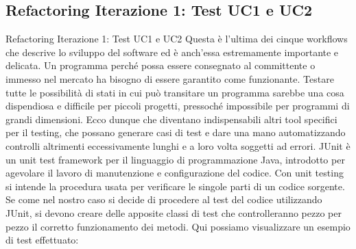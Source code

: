 \subsection {Refactoring Iterazione 1: Test UC1 e UC2}
 \begin{frame}[allowframebreaks] {Refactoring Iterazione 1: Test UC1 e UC2}
    Questa è l'ultima dei cinque workflows che descrive lo sviluppo del software ed è anch'essa estremamente importante e delicata. Un programma perché possa 
   essere consegnato al committente o immesso nel mercato ha bisogno di essere garantito come funzionante. Testare tutte le possibilità di stati in cui può 
   transitare un programma sarebbe una cosa dispendiosa e difficile per piccoli progetti, pressoché impossibile per programmi di grandi dimensioni. Ecco dunque che 
   diventano indispensabili altri tool specifici per il testing, che possano generare casi di test e dare una mano automatizzando controlli altrimenti
   eccessivamente lunghi e a loro volta soggetti ad errori.
   \newline
   JUnit è un unit test framework per il linguaggio di programmazione Java, introdotto per agevolare il lavoro di manutenzione e configurazione del codice.
   \newline 
   Con unit testing si intende la procedura usata per verificare le singole parti di un codice sorgente.
   Se come nel nostro caso si decide di procedere al test del codice utilizzando JUnit, si devono creare delle apposite classi di test che controlleranno pezzo per   
   pezzo il corretto funzionamento dei metodi. Qui possiamo visualizzare un esempio di test effettuato:
  
\end{frame}


